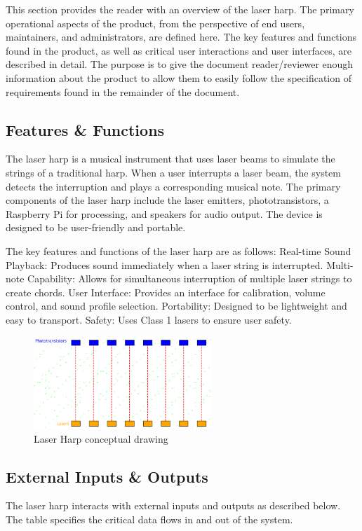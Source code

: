 This section provides the reader with an overview of the laser harp. The primary operational aspects of the product, from the perspective of end users, maintainers, and administrators, are defined here. The key features and functions found in the product, as well as critical user interactions and user interfaces, are described in detail. The purpose is to give the document reader/reviewer enough information about the product to allow them to easily follow the specification of requirements found in the remainder of the document.

\subsection{Features \& Functions}
The laser harp is a musical instrument that uses laser beams to simulate the strings of a traditional harp. When a user interrupts a laser beam, the system detects the interruption and plays a corresponding musical note. The primary components of the laser harp include the laser emitters, phototransistors, a Raspberry Pi for processing, and speakers for audio output. The device is designed to be user-friendly and portable.

The key features and functions of the laser harp are as follows:
Real-time Sound Playback: Produces sound immediately when a laser string is interrupted.
Multi-note Capability: Allows for simultaneous interruption of multiple laser strings to create chords.
User Interface: Provides an interface for calibration, volume control, and sound profile selection.
Portability: Designed to be lightweight and easy to transport.
Safety: Uses Class 1 lasers to ensure user safety.

\begin{figure}[h!]
	\centering
   	\includegraphics[width=0.60\textwidth]{images/Design}
    \caption{Laser Harp conceptual drawing}
\end{figure}

\subsection{External Inputs \& Outputs}
The laser harp interacts with external inputs and outputs as described below. The table specifies the critical data flows in and out of the system.

